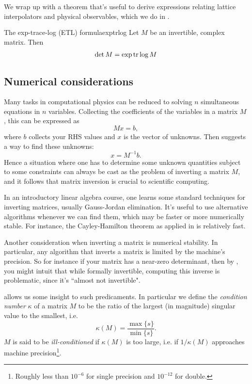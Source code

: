 We wrap up with a theorem that's useful to derive expressions relating
lattice interpolators and physical observables,
which we do in .
\begin{theorem}{The exp-trace-log (ETL) formula}{exptrlog}
  Let $M$ be an invertible, complex matrix. Then
  $$\det M = \exp \tr \log M$$
\end{theorem}


\subsection{Numerical considerations}\label{sec:numerics}


Many tasks in computational physics can be reduced to solving
$n$ simultaneous equations in $n$ variables. Collecting
the coefficients of the variables in a matrix $M$, this
can be expressed as
\begin{equation}\label{eq:solveGeneral}
Mx=b,
\end{equation}
where $b$ collects your RHS values and $x$ is the vector
of unknowns. Then  suggests a way
to find these unknowns:
\begin{equation}
x=M^{-1}b.
\end{equation}
Hence a situation where one has to determine some unknown
quantities subject to some constraints can always be cast
as the problem of inverting a matrix $M$, and it follows that
matrix inversion is crucial to scientific computing.

In an introductory linear algebra course,
one learns some standard techniques for inverting matrices,
usually Gauss-Jordan elimination. 
It's useful to use alternative algorithms whenever we can find them,
which may be faster or more numerically stable.
For instance, the Cayley-Hamilton theorem as applied
in  is relatively fast.

Another consideration when inverting a matrix is numerical
stability. In particular, any algorithm that inverts a matrix is
limited by the machine's precision. So for instance if your
matrix has a near-zero determinant, then by
, you might intuit that while
formally invertible, computing this inverse is problematic,
since it's ``almost not invertible".

 allows us some insight to such predicaments.
In particular we define the {\it condition number}
$\kappa$ of a matrix $M$ to be the ratio of the largest
(in magnitude) singular value to the smallest, i.e.
\begin{equation}
\kappa(M)=\frac{\max\{s\}}{\min\{s\}}.
\end{equation}
$M$ is said to be {\it ill-conditioned}
if $\kappa(M)$ is too large, i.e. if $1/\kappa(M)$ approaches
machine precision\footnote{Roughly less than $10^{-6}$ for
single precision and $10^{-12}$ for double.}.

